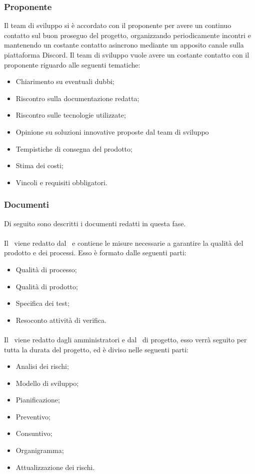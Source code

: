 \subsubsection{Proponente}\label{subsubsection: proponente_fornitura}
Il team di sviluppo si è accordato con il proponente per avere un continuo contatto sul buon proseguo del progetto, organizzando periodicamente incontri e mantenendo un costante contatto asincrono mediante un apposito canale sulla piattaforma Discord\glo.
Il team di sviluppo vuole avere un costante contatto con il proponente riguardo alle seguenti tematiche:
\begin {itemize}
    \item Chiarimento su eventuali dubbi;
    \item Riscontro sulla documentazione redatta;
    \item Riscontro sulle tecnologie utilizzate;
    \item Opinione su soluzioni innovative proposte dal team di sviluppo
    \item Tempistiche di consegna del prodotto;
    \item Stima dei costi;
    \item Vincoli e requisiti obbligatori.
\end{itemize}
\subsubsection {Documenti}\label{subsubsection: documenti_fornitura}
Di seguito sono descritti i documenti redatti in questa fase.
\paragraph{\docNamePdQ}\label{paragraph: PdQ_fornitura}
Il \docNamePdQLow\ viene redatto dal \roleVerifierLow\ e contiene le misure necessarie a garantire la qualità del prodotto e dei processi.
Esso è formato dalle seguenti parti:
\begin{itemize}
    \item Qualità di processo;
    \item Qualità di prodotto;
    \item Specifica dei test;
    \item Resoconto attività di verifica.
\end{itemize}
\paragraph{\docNamePdP}\label{paragraph: PdP_fornitura}
Il \docNamePdPLow\ viene redatto dagli amministratori e dal \roleProjectManagerLow\ di progetto, esso verrà seguito per tutta la durata del progetto, ed è diviso nelle seguenti parti:
\begin{itemize}
    \item Analisi dei rischi;
    \item Modello di sviluppo;
    \item Pianificazione;
    \item Preventivo;
    \item Consuntivo;
    \item Organigramma;
    \item Attualizzazione dei rischi.
\end{itemize} 
